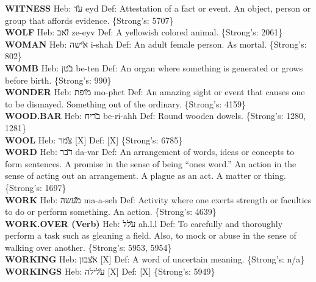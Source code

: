 {\textbf{WITNESS} Heb: {\large\H עד} eyd Def: Attestation of a fact or event. An object, person or group that affords evidence. \{Strong's: 5707\}\hfill{}\\

\textbf{WOLF} Heb: {\large\H זאב} ze-eyv Def: A yellowish colored animal. \{Strong's: 2061\}\hfill{}\\

\textbf{WOMAN} Heb: {\large\H אישה} i-shah Def: An adult female person. As mortal. \{Strong's: 802\}\hfill{}\\

\textbf{WOMB} Heb: {\large\H בטן} be-ten Def: An organ where something is generated or grows before birth. \{Strong's: 990\}\hfill{}\\

\textbf{WONDER} Heb: {\large\H מופת} mo-phet Def: An amazing sight or event that causes one to be dismayed. Something out of the ordinary. \{Strong's: 4159\}\hfill{}\\

\textbf{WOOD.BAR} Heb: {\large\H בריח} be-ri-ahh Def: Round wooden dowels. \{Strong's: 1280, 1281\}\hfill{}\\

\textbf{WOOL} Heb: {\large\H צמר} {[}X{]} Def: {[}X{]} \{Strong's: 6785\}\hfill{}\\

\textbf{WORD} Heb: {\large\H דבר} da-var Def: An arrangement of words, ideas or concepts to form sentences. A promise in the sense of being “ones word.” An action in the sense of acting out an arrangement. A plague as an act. A matter or thing. \{Strong's: 1697\}\hfill{}\\

\textbf{WORK} Heb: {\large\H מעשה} ma-a-seh Def: Activity where one exerts strength or faculties to do or perform something. An action. \{Strong's: 4639\}\hfill{}\\

\textbf{WORK.OVER (Verb)} Heb: {\large\H עלל} ah.l.l Def: To carefully and thoroughly perform a task such as gleaning a field. Also, to mock or abuse in the sense of walking over another. \{Strong's: 5953, 5954\}\hfill{}\\

\textbf{WORKING} Heb: {\large\H אצבון} {[}X{]} Def: A word of uncertain meaning. \{Strong's: n/a\}\hfill{}\\

\textbf{WORKINGS} Heb: {\large\H עלילה} {[}X{]} Def: {[}X{]} \{Strong's: 5949\}\hfill{}\\

}
